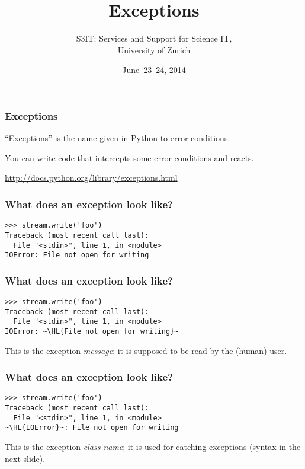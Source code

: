 \documentclass[english,serif,mathserif,xcolor=pdftex,dvipsnames,table]{beamer}
\title[Part 9]{%
  Exceptions
}
\author[S3IT]{%
  S3IT: Services and Support for Science IT, \\
  University of Zurich
}
\date{June~23--24, 2014}
\begin{document}
\maketitle


\begin{frame}[fragile]
  \frametitle{Exceptions}

  ``Exceptions'' is the name given in Python to error conditions.

  \+
  You can write code that intercepts some error conditions and
  reacts.




  \begin{seealso}
    \url{http://docs.python.org/library/exceptions.html}
  \end{seealso}
\end{frame}


\begin{frame}[fragile]
  \frametitle{What does an exception look like?}
\begin{lstlisting}
>>> stream.write('foo')
Traceback (most recent call last):
  File "<stdin>", line 1, in <module>
IOError: File not open for writing
\end{lstlisting}
\end{frame}


\begin{frame}[fragile]
  \frametitle{What does an exception look like?}
\begin{lstlisting}
>>> stream.write('foo')
Traceback (most recent call last):
  File "<stdin>", line 1, in <module>
IOError: ~\HL{File not open for writing}~
\end{lstlisting}

  \+
  This is the exception \emph{message}: it is supposed to be read
  by the (human) user.
\end{frame}


\begin{frame}[fragile]
  \frametitle{What does an exception look like?}
\begin{lstlisting}
>>> stream.write('foo')
Traceback (most recent call last):
  File "<stdin>", line 1, in <module>
~\HL{IOError}~: File not open for writing
\end{lstlisting}

  \+ This is the exception \emph{class name}; it is used for catching
  exceptions (syntax in the next slide).
\end{frame}
\end{document}
